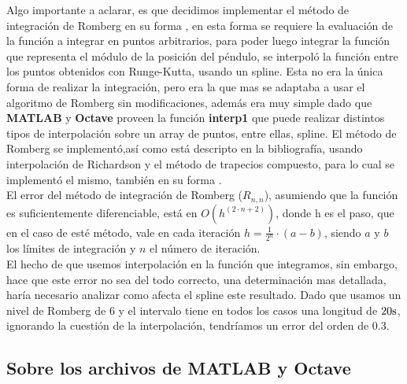Algo importante a aclarar, es que decidimos implementar el método de integración de Romberg en su forma , en esta forma se requiere la evaluación de la función a integrar en puntos arbitrarios, para poder luego integrar la función que representa el módulo de la posición del péndulo, se interpoló la función entre los puntos obtenidos con Runge-Kutta, usando un spline. Esta no era la única forma de realizar la integración, pero era la que mas se adaptaba a usar el algoritmo de Romberg sin modificaciones, además era muy simple dado que \textbf{MATLAB} y \textbf{Octave} proveen la función \textbf{interp1} que puede realizar distintos tipos de interpolación sobre un array de puntos, entre ellas, spline.
El método de Romberg se implementó,así como está descripto en la bibliografía, usando interpolación de Richardson y el método de trapecios compuesto, para lo cual se implementó el mismo, también en su forma .\\

El error del método de integración de Romberg ($R_{n,n}$), asumiendo que la función es suficientemente diferenciable, está en $O \left(  h^{\left( 2 \cdot n + 2 \right)}  \right)$, donde h es el paso, que en el caso de esté método, vale en cada iteración $h = \frac{1}{2^{n}} \cdot \left( a - b \right)$, siendo $a$ y $b$ los límites de integración y $n$ el número de iteración.\\

El hecho de que usemos interpolación en la función que integramos, sin embargo, hace que este error no sea del todo correcto, una determinación mas detallada, haría necesario analizar como afecta el spline este resultado. Dado que usamos un nivel de Romberg de $6$ y el intervalo tiene en todos los casos una longitud de $20 \si[per-mode=symbol]{\second}$, ignorando la cuestión de la interpolación, tendríamos un error del orden de $0.3$.






\clearpage

\subsection{Sobre los archivos de \textbf{MATLAB} y \textbf{Octave}}


